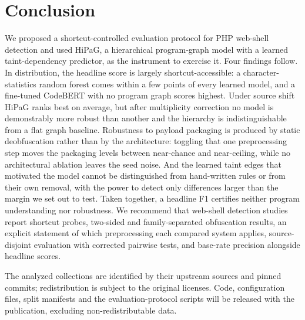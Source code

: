 \documentclass[pdflatex,sn-mathphys-num]{sn-jnl}
\begin{document}
\section{Conclusion}\label{sec:conclusion}
We proposed a shortcut-controlled evaluation protocol for PHP web-shell
detection and used HiPaG, a hierarchical program-graph model with a learned
taint-dependency predictor, as the instrument to exercise it. Four findings
follow. In distribution, the headline score is largely shortcut-accessible: a
character-statistics random forest comes within a few points of every learned
model, and a fine-tuned CodeBERT with no program graph scores highest. Under
source shift HiPaG ranks best on average, but after multiplicity correction no
model is demonstrably more robust than another and the hierarchy is
indistinguishable from a flat graph baseline. Robustness to payload packaging
is produced by static deobfuscation rather than by the architecture: toggling
that one preprocessing step moves the packaging levels between near-chance and
near-ceiling, while no architectural ablation leaves the seed noise. And the
learned taint edges that motivated the model cannot be distinguished from
hand-written rules or from their own removal, with the power to detect only
differences larger than the margin we set out to test. Taken together, a
headline F1 certifies neither program understanding nor robustness. We
recommend that web-shell detection studies report shortcut probes, two-sided
and family-separated obfuscation results, an explicit statement of which
preprocessing each compared system applies, source-disjoint evaluation with
corrected pairwise tests, and base-rate precision alongside headline scores.

\backmatter

The analyzed collections are identified by their upstream sources and pinned
commits; redistribution is subject to the original licenses. Code,
configuration files, split manifests and the evaluation-protocol scripts will
be released with the publication, excluding non-redistributable data.
\end{document}
